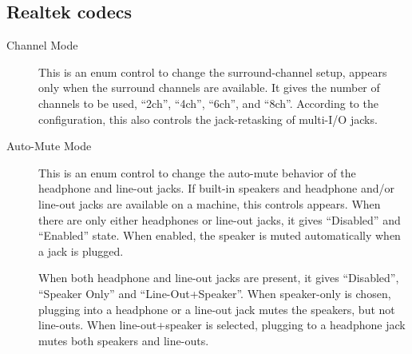 \documentclass[a4paper,8pt,english]{sphinxmanual}
\begin{document}
\subsection{Realtek codecs}
\label{sound/hd-audio/controls:realtek-codecs}\begin{description}
\item[{Channel Mode}] \leavevmode
This is an enum control to change the surround-channel setup,
appears only when the surround channels are available.
It gives the number of channels to be used, ``2ch'', ``4ch'', ``6ch'',
and ``8ch''.  According to the configuration, this also controls the
jack-retasking of multi-I/O jacks.

\item[{Auto-Mute Mode}] \leavevmode
This is an enum control to change the auto-mute behavior of the
headphone and line-out jacks.  If built-in speakers and headphone
and/or line-out jacks are available on a machine, this controls
appears.
When there are only either headphones or line-out jacks, it gives
``Disabled'' and ``Enabled'' state.  When enabled, the speaker is muted
automatically when a jack is plugged.

When both headphone and line-out jacks are present, it gives
``Disabled'', ``Speaker Only'' and ``Line-Out+Speaker''.  When
speaker-only is chosen, plugging into a headphone or a line-out jack
mutes the speakers, but not line-outs.  When line-out+speaker is
selected, plugging to a headphone jack mutes both speakers and
line-outs.

\end{description}
\end{document}
